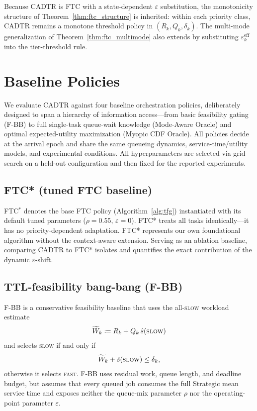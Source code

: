 \documentclass[fleqn,12pt,lineno]{wlpeerj}
\begin{document}
Because CADTR is FTC with a state-dependent $\varepsilon$ substitution, the monotonicity structure of Theorem~\ref{thm:ftc_structure} is inherited: within each priority class, CADTR remains a monotone threshold policy in $(R_k, Q_k, \delta_k)$. The multi-mode generalization of Theorem~\ref{thm:ftc_multimode} also extends by substituting $\varepsilon_k^{\mathrm{eff}}$ into the tier-threshold rule.


\section{Baseline Policies}
\label{sec:baselines}

We evaluate CADTR against four baseline orchestration policies, deliberately designed to span a hierarchy of information access---from basic feasibility gating (F-BB) to full single-task queue-wait knowledge (Mode-Aware Oracle) and optimal expected-utility maximization (Myopic CDF Oracle). All policies decide at the arrival epoch and share the same queueing dynamics, service-time/utility models, and experimental conditions. All hyperparameters are selected via grid search on a held-out configuration and then fixed for the reported experiments.

\subsection{FTC* (tuned FTC baseline)}
\label{sec:baseline_ftcstar}

FTC$^{\ast}$ denotes the base FTC policy (Algorithm~\ref{alg:tfg}) instantiated with its default tuned parameters ($\rho=0.55$, $\varepsilon=0$). FTC* treats all tasks identically---it has no priority-dependent adaptation. FTC* represents our own foundational algorithm without the context-aware extension. Serving as an ablation baseline, comparing CADTR to FTC* isolates and quantifies the exact contribution of the dynamic $\varepsilon$-shift.

\subsection{TTL-feasibility bang-bang (F-BB)}
\label{sec:baseline_fbb}

F-BB is a conservative feasibility baseline that uses the all-\textsc{slow} workload estimate
\[
\widetilde{W}_k \coloneqq R_k + Q_k\,\hat{s}(\textsc{slow})
\]
and selects \textsc{slow} if and only if
\begin{equation}
\widetilde{W}_k + \hat{s}(\textsc{slow}) \le \delta_k,
\label{eq:baseline_ttl_bangbang}
\end{equation}
otherwise it selects \textsc{fast}. F-BB uses residual work, queue length, and deadline budget, but assumes that every queued job consumes the full Strategic mean service time and exposes neither the queue-mix parameter $\rho$ nor the operating-point parameter $\varepsilon$.
\end{document}
